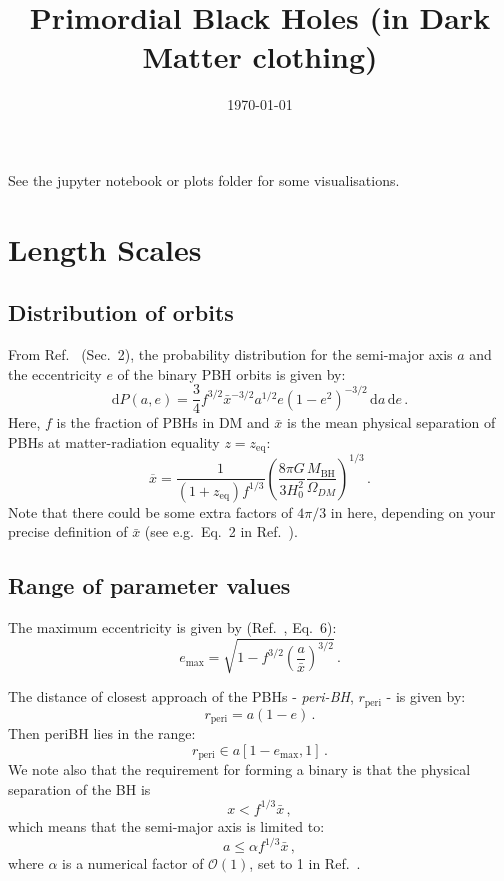 \documentclass[a4paper,11pt]{article}
\newcommand{\rperi}{r_\mathrm{peri}}
\begin{document}
\title{Primordial Black Holes (in Dark Matter clothing)}
\date{\today}
\maketitle

See the jupyter notebook or plots folder for some visualisations.

\section{Length Scales}

\subsection{Distribution of orbits}

From Ref.~\cite{Sasaki:2016jop} (Sec.~2), the probability distribution for the semi-major axis $a$ and the eccentricity $e$ of the binary PBH orbits is given by:
\begin{equation}
\mathrm{d}P(a,e) = \frac{3}{4} f^{3/2} \bar{x}^{-3/2} a^{1/2} e (1-e^2)^{-3/2}\,\mathrm{d}a\,\mathrm{d}e\,.
\end{equation}
Here, $f$ is the fraction of PBHs in DM and $\bar{x}$ is the mean physical separation of PBHs at matter-radiation equality $z = z_\mathrm{eq}$:
\begin{equation}
\overline{x} = \frac{1}{(1+z_\mathrm{eq}) f^{1/3}} \left(\frac{8\pi G}{3 H_0^2} \frac{M_\mathrm{BH}}{\Omega_{DM}}\right)^{1/3}\,.
\end{equation}
Note that there could be some extra factors of $4\pi/3$ in here, depending on your precise definition of $\bar{x}$ (see e.g.~Eq.~2 in Ref.~\cite{Ali-Haimoud:2017rtz}).


\subsection{Range of parameter values}

The maximum eccentricity is given by (Ref.~\cite{Sasaki:2016jop}, Eq.~6):
\begin{equation}
e_\mathrm{max} = \sqrt{1 - f^{3/2} \left(\frac{a}{\bar{x}}\right)^{3/2}}\,.
\end{equation}

The distance of closest approach of the PBHs - \textit{peri-BH}, $r_\mathrm{peri}$ - is given by:
\begin{equation}
r_\mathrm{peri} = a (1-e)\,.
\end{equation}
Then periBH lies in the range:
\begin{equation}
\rperi \in a[1 - e_\mathrm{max}, 1]\,.
\end{equation}
We note also that the requirement for forming a binary is that the physical separation of the BH is
\begin{equation}
x < f^{1/3} \bar{x}\,,
\end{equation}
which means that the semi-major axis is limited to:
\begin{equation}
a \leq \alpha f^{1/3} \bar{x}\,,
\end{equation}
where $\alpha$ is a numerical factor of $\mathcal{O}(1)$, set to 1 in Ref.~\cite{Sasaki:2016jop}.
\end{document}
